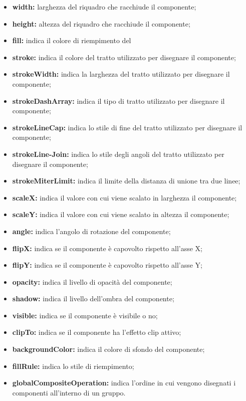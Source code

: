 \begin{itemize}
\begin{itemize}
			\item \textbf{width:} larghezza del riquadro che racchiude il componente;
			\item \textbf{height:} altezza del riquadro che racchiude il componente;
			\item \textbf{fill:} indica il colore di riempimento del
			\item \textbf{stroke:} indica il colore del tratto utilizzato per disegnare il componente;
			\item \textbf{strokeWidth:} indica la larghezza del tratto utilizzato per disegnare il componente;
			\item \textbf{strokeDashArray:} indica il tipo di tratto utilizzato per disegnare il componente;
			\item \textbf{strokeLineCap:} indica lo stile di fine del tratto utilizzato per disegnare il componente;
			\item \textbf{strokeLine-Join:} indica lo stile degli angoli del tratto utilizzato per disegnare il componente;
			\item \textbf{strokeMiterLimit:} indica il limite della distanza di unione tra due linee;
			\item \textbf{scaleX:} indica il valore con cui viene scalato in larghezza il componente;
			\item \textbf{scaleY:} indica il valore con cui viene scalato in altezza il componente;
			\item \textbf{angle:} indica l'angolo di rotazione del componente;
			\item \textbf{flipX:} indica se il componente è capovolto rispetto all'asse X;
			\item \textbf{flipY:} indica se il componente è capovolto rispetto all'asse Y;
			\item \textbf{opacity:} indica il livello di opacità del componente;
			\item \textbf{shadow:} indica il livello dell'ombra del componente;
			\item \textbf{visible:} indica  se il componente è visibile o no;
			\item \textbf{clipTo:} indica se il componente ha l'effetto clip attivo;
			\item \textbf{backgroundColor:} indica il colore di sfondo del componente;
			\item \textbf{fillRule:} indica lo stile di riempimento;
			\item \textbf{globalCompositeOperation:} indica l'ordine in cui vengono disegnati i componenti all'interno di un gruppo.
		\end{itemize}
	\end{itemize}
\newpage

